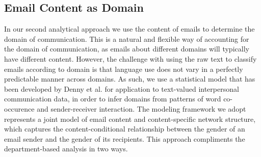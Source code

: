 \documentclass{pnastwo}
\begin{document}
\begin{article}
\section{Email Content as Domain}

In our second analytical approach we use the content of emails to determine the domain of communication. This is a natural and flexible way of accounting for the domain of communication, as emails about different domains will typically have different content. However, the challenge with using the raw text to classify emails according to domain is that language use does not vary in a perfectly predictable manner across domains. As such, we use a statistical model that has been developed by Denny et al$.$ \citep{Denny2015} for application to text-valued interpersonal communication data, in order to infer domains from patterns of word co-occurence and sender-receiver interaction. The modeling framework we adopt represents a joint model of email content and content-specific network structure, which captures the content-conditional relationship between the gender of an email sender and the gender of its recipients.  This approach compliments the department-based analysis in two ways. 







\end{article}
\end{document}
